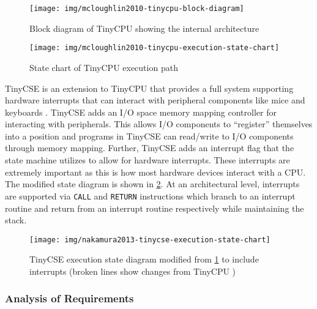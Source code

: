 \begin{figure}[t!]
    \centering
    \texttt{[image: img/mcloughlin2010-tinycpu-block-diagram]}
    \caption{Block diagram of TinyCPU showing the internal architecture \cite[p.~869]{McLoughlin2010}}
    \label{fig:mcloughlin2010-tinycpu-block-diagram}
    \texttt{[image: img/mcloughlin2010-tinycpu-execution-state-chart]}
    \caption{State chart of TinyCPU execution path \cite[p.~869]{McLoughlin2010}}
    \label{fig:mcloughlin2010-tinycpu-state-chart}
\end{figure}

TinyCSE is an extension to TinyCPU that provides a full system supporting hardware interrupts that can interact with peripheral components like mice and keyboards \cite{Nakamura2013}. TinyCSE adds an I/O space memory mapping controller for interacting with peripherals. This allows I/O components to ``register'' themselves into a position and programs in TinyCSE can read/write to I/O components through memory mapping. Further, TinyCSE adds an interrupt flag that the state machine utilizes to allow for hardware interrupts. These interrupts are extremely important as this is how most hardware devices interact with a CPU. The modified state diagram is shown in \cref{fig:nakamura2013-tinycse-execution-state-chart}. At an architectural level, interrupts are supported via \verb|CALL| and \verb|RETURN| instructions which branch to an interrupt routine and return from an interrupt routine respectively while maintaining the stack.

\begin{figure}[b!]
    \centering
    \texttt{[image: img/nakamura2013-tinycse-execution-state-chart]}
    \caption{TinyCSE execution state diagram modified from \cref{fig:mcloughlin2010-tinycpu-state-chart} to include interrupts (broken lines show changes from TinyCPU \cite{McLoughlin2010}) \cite[p.~640]{Nakamura2013}}
    \label{fig:nakamura2013-tinycse-execution-state-chart}
\end{figure}

\subsubsection*{Analysis of Requirements}

